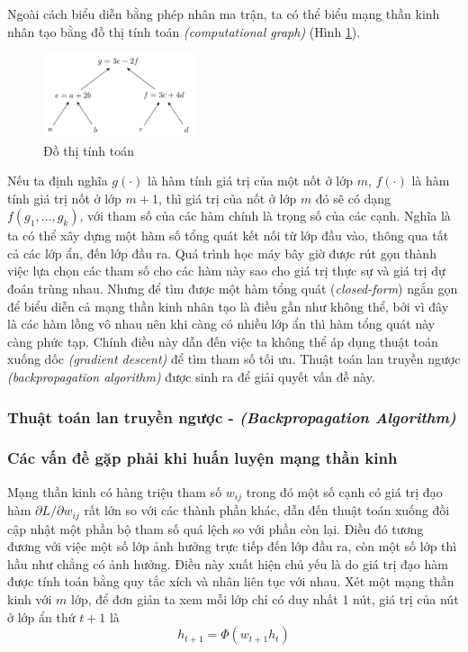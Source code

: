 Ngoài cách biểu diễn bằng phép nhân ma trận, ta có thể biểu mạng thần kinh nhân tạo bằng đồ thị tính toán \textit{(computational graph)} (Hình \ref{figure:computational-graph}).
\begin{figure}[htbp]
    \centering
    \includegraphics[width=0.4\textwidth]{tikz_image/computational_graph.pdf}
    \caption{Đồ thị tính toán}
    \label{figure:computational-graph}
\end{figure}

Nếu ta định nghĩa $g(\cdot)$ là hàm tính giá trị của một nốt ở lớp $m$, $f(\cdot)$ là hàm tính giá trị nốt ở lớp $m+1$, thì  giá trị của nốt ở lớp $m$ đó sẽ có dạng $f(g_1,\dots,g_k)$, với tham số của các hàm chính là trọng số của các cạnh. Nghĩa là ta có thể xây dựng một hàm số tổng quát kết nối từ lớp đầu vào, thông qua tất cả các lớp ẩn, đến lớp đầu ra. Quá trình học máy bây giờ được rút gọn thành việc lựa chọn các tham số cho các hàm này sao cho giá trị thực sự và giá trị dự đoán trùng nhau. Nhưng để tìm được một hàm tổng quát (\textit{closed-form}) ngắn gọn để biểu diễn cả mạng thần kinh nhân tạo là điều gần như không thể, bởi vì đây là các hàm lồng vô nhau nên khi càng có nhiều lớp ẩn thì hàm tổng quát này càng phức tạp. Chính điều này dẫn đến việc ta không thể áp dụng thuật toán xuống dốc \textit{(gradient descent)} để tìm tham số tối ưu. Thuật toán lan truyền ngược \textit{(backpropagation algorithm)} được sinh ra để giải quyết vấn đề này.\cite{Aggarwal2023-zk}

\subsubsection{Thuật toán lan truyền ngược - \textit{(Backpropagation Algorithm)}}


\subsubsection{Các vấn đề gặp phải khi huấn luyện mạng thần kinh}
Mạng thần kinh có hàng triệu tham số $w_{ij}$ trong đó một số cạnh có giá trị đạo hàm $\partial L/\partial w_{ij}$ rất lớn so với các thành phần khác, dẫn đến thuật toán xuống đồi cập nhật một phần bộ tham số quá lệch so với phần còn lại. Điều đó tương đương với việc một số lớp ảnh hưởng trực tiếp đến lớp đầu ra, còn một số lớp thì hầu như chẳng có ảnh hưởng. Điều này xuất hiện chủ yếu là do giá trị đạo hàm được tính toán bằng quy tắc xích và nhân liên tục với nhau. Xét một mạng thần kinh với $m$ lớp, để đơn giản ta xem mỗi lớp chỉ có duy nhất 1 nút, giá trị của nút ở lớp ẩn thứ $t+1$ là
\[
    h_{t+1}=\Phi(w_{t+1}h_t)
\]


